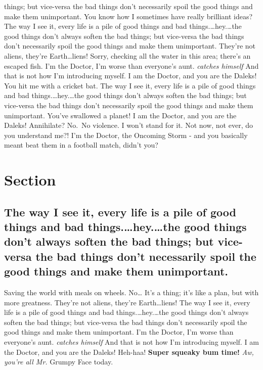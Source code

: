 \documentclass[
]{report}
\begin{document}
things; but vice-versa the bad things don't necessarily spoil the good
things and make them unimportant. You know how I sometimes have really
brilliant ideas? The way I see it, every life is a pile of good things
and bad things.\ldots{}hey.\ldots{}the good things don't always soften
the bad things; but vice-versa the bad things don't necessarily spoil
the good things and make them unimportant. They're not aliens, they're
Earth\ldots{}liens! Sorry, checking all the water in this area; there's
an escaped fish. I'm the Doctor, I'm worse than everyone's aunt.
\emph{catches himself} And that is not how I'm introducing myself. I am
the Doctor, and you are the Daleks! You hit me with a cricket bat. The
way I see it, every life is a pile of good things and bad
things.\ldots{}hey.\ldots{}the good things don't always soften the bad
things; but vice-versa the bad things don't necessarily spoil the good
things and make them unimportant. You've swallowed a planet! I am the
Doctor, and you are the Daleks! Annihilate? No.~No violence. I won't
stand for it. Not now, not ever, do you understand me?! I'm the Doctor,
the Oncoming Storm - and you basically meant beat them in a football
match, didn't you?

\hypertarget{section-3.2}{%
\section{Section}\label{section-3.2}}

\hypertarget{the-way-i-see-it-every-life-is-a-pile-of-good-things-and-bad-things.hey.the-good-things-dont-always-soften-the-bad-things-but-vice-versa-the-bad-things-dont-necessarily-spoil-the-good-things-and-make-them-unimportant.}{%
\subsection{The way I see it, every life is a pile of good things and
bad things.\ldots{}hey.\ldots{}the good things don't always soften the
bad things; but vice-versa the bad things don't necessarily spoil the
good things and make them
unimportant.}\label{the-way-i-see-it-every-life-is-a-pile-of-good-things-and-bad-things.hey.the-good-things-dont-always-soften-the-bad-things-but-vice-versa-the-bad-things-dont-necessarily-spoil-the-good-things-and-make-them-unimportant.}}

Saving the world with meals on wheels. No\ldots{} It's a thing; it's
like a plan, but with more greatness. They're not aliens, they're
Earth\ldots{}liens! The way I see it, every life is a pile of good
things and bad things.\ldots{}hey.\ldots{}the good things don't always
soften the bad things; but vice-versa the bad things don't necessarily
spoil the good things and make them unimportant. I'm the Doctor, I'm
worse than everyone's aunt. \emph{catches himself} And that is not how
I'm introducing myself. I am the Doctor, and you are the Daleks!
Heh-haa! \textbf{Super squeaky bum time!} \emph{Aw, you're all Mr.}
Grumpy Face today.
\end{document}
